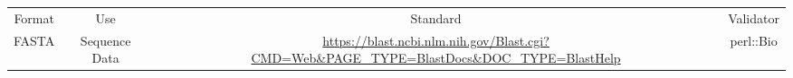 \begin{tabular}{cccc}
{Format} & {Use} & {Standard} & {Validator} \\
FASTA & Sequence Data & \url{https://blast.ncbi.nlm.nih.gov/Blast.cgi?CMD=Web&PAGE_TYPE=BlastDocs&DOC_TYPE=BlastHelp} & perl::Bio\\
\end{tabular}
